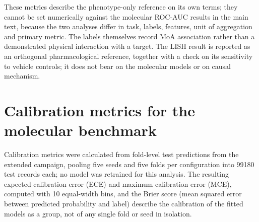 \documentclass[11pt,a4paper]{article}
\begin{document}
These metrics describe the phenotype-only reference on its own terms; they cannot be set numerically against the molecular ROC-AUC results in the main text, because the two analyses differ in task, labels, features, unit of aggregation and primary metric. The labels themselves record MoA association rather than a demonstrated physical interaction with a target. The LISH result is reported as an orthogonal pharmacological reference, together with a check on its sensitivity to vehicle controls; it does not bear on the molecular models or on causal mechanism.

\section{Calibration metrics for the molecular benchmark}
\label{sec:calibration_si}

Calibration metrics were calculated from fold-level test predictions from the extended campaign, pooling five seeds and five folds per configuration into \num{99180} test records each; no model was retrained for this analysis. The resulting expected calibration error (ECE) and maximum calibration error (MCE), computed with \num{10} equal-width bins, and the Brier score (mean squared error between predicted probability and label) describe the calibration of the fitted models as a group, not of any single fold or seed in isolation.
\end{document}
